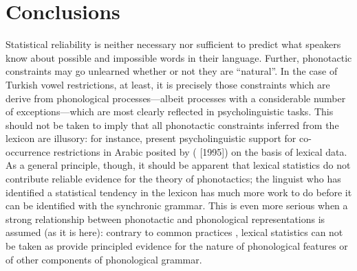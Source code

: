 

\section{Conclusions}

Statistical reliability is neither necessary nor sufficient to predict what speakers know about possible and impossible words in their language.
Further, phonotactic constraints may go unlearned whether or not they are ``natural''.
In the case of Turkish vowel restrictions, at least, it is precisely those constraints which are derive from phonological processes---albeit processes with a considerable number of exceptions---which are most clearly reflected in psycholinguistic tasks.
This should not be taken to imply that all phonotactic constraints inferred from the lexicon are illusory: for instance, \citet{Frisch2001} present psycholinguistic support for co-occurrence restrictions in Arabic posited by \citeauthor{Frisch2004} (\citeyear{Frisch2004} [1995]) on the basis of lexical data.
As a general principle, though, it should be apparent that lexical statistics do not contribute reliable evidence for the theory of phonotactics; the linguist who has identified a statistical tendency in the lexicon has much more work to do before it can be identified with the synchronic grammar.
This is even more serious when a strong relationship between phonotactic and phonological representations is assumed (as it is here): contrary to common practices \citep[e.g.,][]{Mester1988,Padgett1991,Padgett1992}, lexical statistics can not be taken as provide principled evidence for the nature of phonological features or of other components of phonological grammar.

